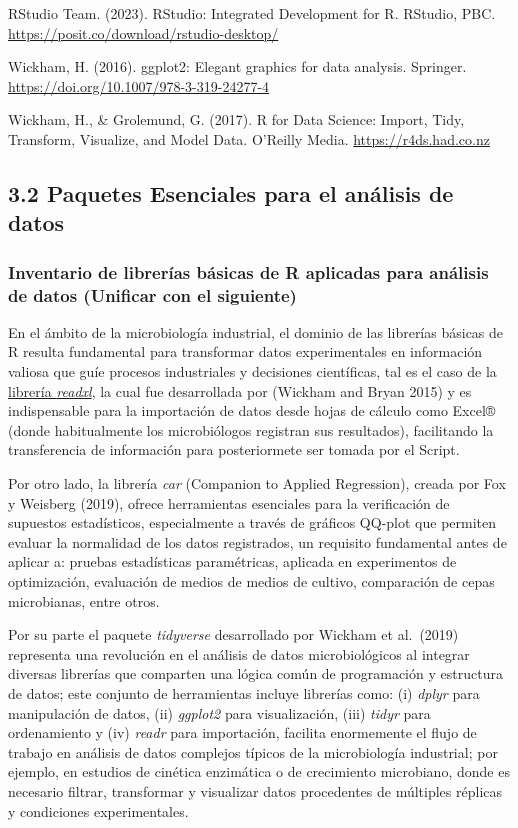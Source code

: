 \documentclass[
  letterpaper,
  DIV=11,
  numbers=noendperiod]{scrreprt}
\begin{document}
RStudio Team. (2023). RStudio: Integrated Development for R. RStudio,
PBC. \url{https://posit.co/download/rstudio-desktop/}

Wickham, H. (2016). ggplot2: Elegant graphics for data analysis.
Springer. \url{https://doi.org/10.1007/978-3-319-24277-4}

Wickham, H., \& Grolemund, G. (2017). R for Data Science: Import, Tidy,
Transform, Visualize, and Model Data. O'Reilly Media.
\href{https://r4ds.had.co.nz/}{https://r4ds.had.co.nz}

\subsection{3.2 Paquetes Esenciales para el análisis de
datos}\label{paquetes-esenciales-para-el-anuxe1lisis-de-datos}

\subsubsection{Inventario de librerías básicas de R aplicadas para
análisis de datos (Unificar con el
siguiente)}\label{inventario-de-libreruxedas-buxe1sicas-de-r-aplicadas-para-anuxe1lisis-de-datos-unificar-con-el-siguiente}

En el ámbito de la microbiología industrial, el dominio de las librerías
básicas de R resulta fundamental para transformar datos experimentales
en información valiosa que guíe procesos industriales y decisiones
científicas, tal es el caso de la
\href{https://cran.r-project.org/web/packages/readxl/index.html}{librería
\emph{readxl}}, la cual fue desarrollada por (Wickham and Bryan 2015) y
es indispensable para la importación de datos desde hojas de cálculo
como Excel® (donde habitualmente los microbiólogos registran sus
resultados), facilitando la transferencia de información para
posteriormete ser tomada por el Script.

Por otro lado, la librería \emph{car} (Companion to Applied Regression),
creada por Fox y Weisberg (2019), ofrece herramientas esenciales para la
verificación de supuestos estadísticos, especialmente a través de
gráficos QQ-plot que permiten evaluar la normalidad de los datos
registrados, un requisito fundamental antes de aplicar a: pruebas
estadísticas paramétricas, aplicada en experimentos de optimización,
evaluación de medios de medios de cultivo, comparación de cepas
microbianas, entre otros.

Por su parte el paquete \emph{tidyverse} desarrollado por Wickham et
al.~(2019) representa una revolución en el análisis de datos
microbiológicos al integrar diversas librerías que comparten una lógica
común de programación y estructura de datos; este conjunto de
herramientas incluye librerías como: (i) \emph{dplyr} para manipulación
de datos, (ii) \emph{ggplot2} para visualización, (iii) \emph{tidyr}
para ordenamiento y (iv) \emph{readr} para importación, facilita
enormemente el flujo de trabajo en análisis de datos complejos típicos
de la microbiología industrial; por ejemplo, en estudios de cinética
enzimática o de crecimiento microbiano, donde es necesario filtrar,
transformar y visualizar datos procedentes de múltiples réplicas y
condiciones experimentales.
\end{document}
